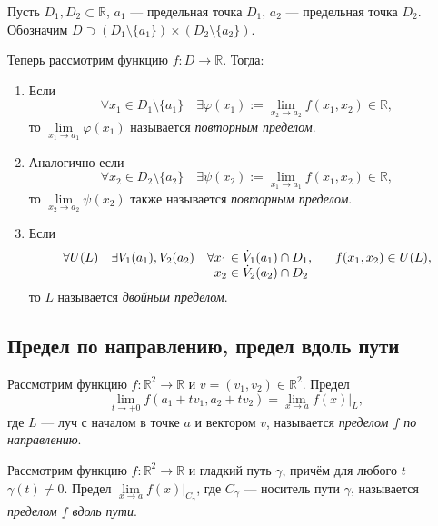 \begin{definition}
	Пусть \(D_1, D_2 \subset \mathbb{R}\), \(a_1\) --- предельная точка \(D_1\), \(a_2\) --- предельная точка \(D_2\). Обозначим \(D \supset (D_1 \setminus \{a_1\}) \times (D_2 \setminus \{a_2\})\).
	
	Теперь рассмотрим функцию \(f \colon D \to \mathbb{R}\). Тогда:
	\begin{enumerate}
		\item Если \[
		\forall x_1 \in D_1 \setminus \{a_1\} \quad \exists \varphi(x_1) := \lim_{x_2 \to a_2} f (x_1, x_2) \in \mathbb{R},
		\]
		то \(\lim\limits_{x_1 \to a_1} \varphi(x_1)\) называется \textit{повторным пределом}.
		\item Аналогично если \[
		\forall x_2 \in D_2 \setminus \{a_2\} \quad \exists \psi(x_2) := \lim_{x_1 \to a_1} f (x_1, x_2) \in \mathbb{R},
		\]
		то \(\lim\limits_{x_2 \to a_2} \psi(x_2)\) также называется \textit{повторным пределом}.
		\item Если \[
		\forall U(L) \quad \exists V_1 (a_1), V_2 (a_2) \quad \forall \parbox[t]{3cm}{\(x_1 \in \dot V_1 (a_1) \cap D_1\), \\ \(x_2 \in \dot V_2 (a_2) \cap D_2\)} \quad f(x_1, x_2) \in U(L),
		\]
		то \(L\) называется \textit{двойным пределом}.
	\end{enumerate}
\end{definition}

\subsection{Предел по направлению, предел вдоль пути}

\begin{ndefinition}
	Рассмотрим функцию \(f \colon \mathbb{R}^2 \to \mathbb{R}\) и \(v = (v_1, v_2) \in \mathbb{R}^2\). Предел \[
		\lim\limits_{t \to +0} f(a_1 + t v_1, a_2 + t v_2) = \lim\limits_{x \to a} f(x) |_L,
	\]
	где \(L\) --- луч с началом в точке \(a\) и вектором \(v\), называется \textit{пределом \(f\) по направлению}.
\end{ndefinition}

\begin{ndefinition}
	Рассмотрим функцию \(f \colon \mathbb{R}^2 \to \mathbb{R}\) и гладкий путь \(\gamma\), причём для любого \(t\) \(\gamma(t) \neq 0\). Предел \(\lim\limits_{x \to a} f(x) |_{C_\gamma}\), где \(C_\gamma\) --- носитель пути \(\gamma\), называется \textit{пределом \(f\) вдоль пути}.
\end{ndefinition}

